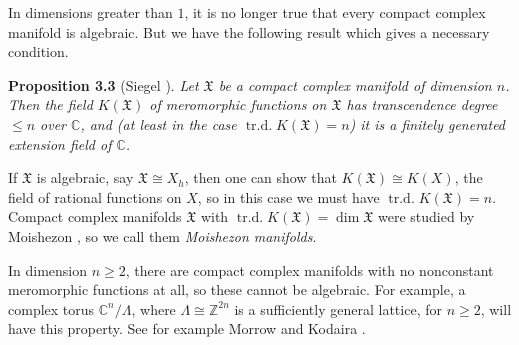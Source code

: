 {\medskip
In dimensions greater than $1$, it is no longer true that every compact complex manifold is algebraic. But we have the following result which gives a necessary condition.

\medskip
\noindent\hypertarget{result-B-3.3}{}\textbf{Proposition 3.3} (Siegel ). \emph{Let $\mathfrak X$ be a compact complex manifold of dimension $n$. Then the field $K(\mathfrak X)$ of meromorphic functions on $\mathfrak X$ has transcendence degree $\leq n$ over $\mathbb C$, and (at least in the case $\operatorname{tr.d.}K(\mathfrak X)=n$) it is a finitely generated extension field of $\mathbb C$.}

\medskip
If $\mathfrak X$ is algebraic, say $\mathfrak X\cong X_h$, then one can show that $K(\mathfrak X)\cong K(X)$, the field of rational functions on $X$, so in this case we must have $\operatorname{tr.d.}K(\mathfrak X)=n$. Compact complex manifolds $\mathfrak X$ with $\operatorname{tr.d.}K(\mathfrak X)=\dim\mathfrak X$ were studied by Moishezon , so we call them \emph{Moishezon manifolds}.

In dimension $n\geq2$, there are compact complex manifolds with no nonconstant meromorphic functions at all, so these cannot be algebraic. For example, a complex torus $\mathbb C^n/\Lambda$, where $\Lambda\cong\mathbb Z^{2n}$ is a sufficiently general lattice, for $n\geq2$, will have this property. See for example Morrow and Kodaira .
}
